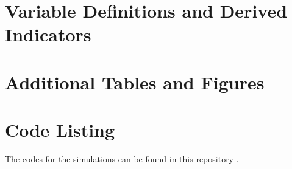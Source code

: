 \appendix
\section{Variable Definitions and Derived Indicators}
\section{Additional Tables and Figures}
\section{Code Listing}

The codes for the simulations can be found in this repository \cite{github-repo}.